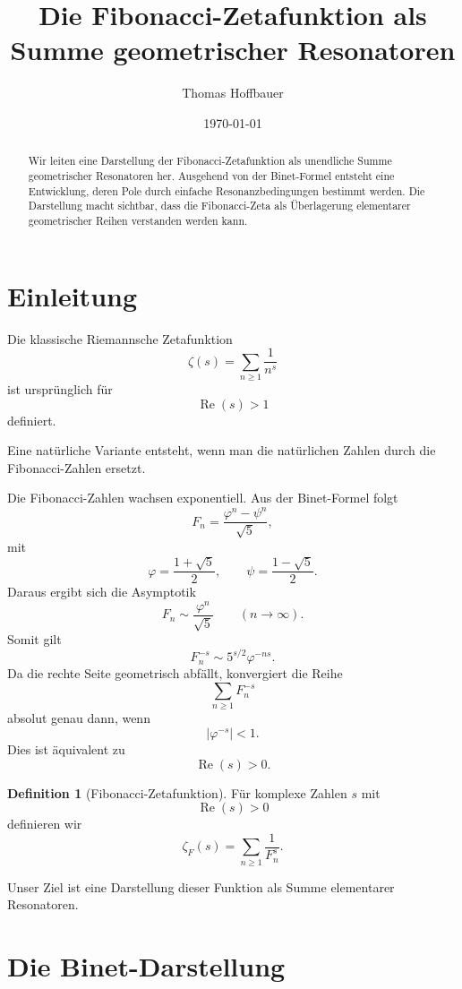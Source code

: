 \documentclass[11pt]{article}
\title{Die Fibonacci-Zetafunktion als Summe geometrischer Resonatoren}
\author{Thomas Hoffbauer}
\date{\today}
\theoremstyle{definition}
\newtheorem{definition}{Definition}
\begin{document}
	
	\maketitle
	
	\begin{abstract}
		Wir leiten eine Darstellung der Fibonacci-Zetafunktion als unendliche
		Summe geometrischer Resonatoren her.
		Ausgehend von der Binet-Formel entsteht eine Entwicklung,
		deren Pole durch einfache Resonanzbedingungen bestimmt werden.
		Die Darstellung macht sichtbar, dass die Fibonacci-Zeta
		als \"Uberlagerung elementarer geometrischer Reihen verstanden werden kann.
	\end{abstract}
	
	\section{Einleitung}
	
	Die klassische Riemannsche Zetafunktion
	\[
	\zeta(s)
	=
	\sum_{n\ge1}\frac1{n^s}
	\]
	ist urspr\"unglich f\"ur
	\[
	\operatorname{Re}(s)>1
	\]
	definiert.
	
	Eine nat\"urliche Variante entsteht,
	wenn man die nat\"urlichen Zahlen durch die Fibonacci-Zahlen ersetzt.
	
	Die Fibonacci-Zahlen wachsen exponentiell.
	Aus der Binet-Formel folgt
	\[
	F_n
	=
	\frac{\varphi^n-\psi^n}{\sqrt5},
	\]
	mit
	\[
	\varphi
	=
	\frac{1+\sqrt5}{2},
	\qquad
	\psi
	=
	\frac{1-\sqrt5}{2}.
	\]
	Daraus ergibt sich die Asymptotik
	\[
	F_n
	\sim
	\frac{\varphi^n}{\sqrt5}
	\qquad (n\to\infty).
	\]
	Somit gilt
	\[
	F_n^{-s}
	\sim
	5^{s/2}\varphi^{-ns}.
	\]
	Da die rechte Seite geometrisch abf\"allt,
	konvergiert die Reihe
	\[
	\sum_{n\ge1}F_n^{-s}
	\]
	absolut genau dann, wenn
	\[
	|\varphi^{-s}|<1.
	\]
	Dies ist \"aquivalent zu
	\[
	\operatorname{Re}(s)>0.
	\]
	
	\begin{definition}[Fibonacci-Zetafunktion]
		F\"ur komplexe Zahlen $s$ mit
		\[
		\operatorname{Re}(s)>0
		\]
		definieren wir
		\[
		\zeta_F(s)
		=
		\sum_{n\ge1}
		\frac1{F_n^s}.
		\]
	\end{definition}
	
	Unser Ziel ist eine Darstellung dieser Funktion
	als Summe elementarer Resonatoren.
	
	\section{Die Binet-Darstellung}
	
\end{document}
